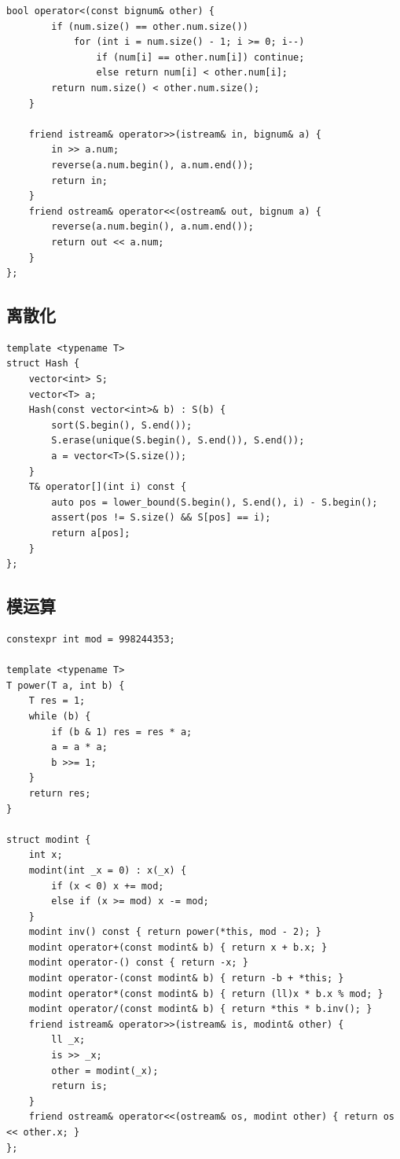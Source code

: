 \documentclass[UTF8, twoside]{ctexart}
\begin{document}
\begin{sloppypar}
\begin{lstlisting}[style=cpp]
    bool operator<(const bignum& other) {
        if (num.size() == other.num.size())
            for (int i = num.size() - 1; i >= 0; i--)
                if (num[i] == other.num[i]) continue;
                else return num[i] < other.num[i];
        return num.size() < other.num.size();
    }

    friend istream& operator>>(istream& in, bignum& a) {
        in >> a.num;
        reverse(a.num.begin(), a.num.end());
        return in;
    }
    friend ostream& operator<<(ostream& out, bignum a) {
        reverse(a.num.begin(), a.num.end());
        return out << a.num;
    }
};
\end{lstlisting}

\subsection{离散化}

\begin{lstlisting}[style=cpp]
template <typename T>
struct Hash {
    vector<int> S;
    vector<T> a;
    Hash(const vector<int>& b) : S(b) {
        sort(S.begin(), S.end());
        S.erase(unique(S.begin(), S.end()), S.end());
        a = vector<T>(S.size());
    }
    T& operator[](int i) const {
        auto pos = lower_bound(S.begin(), S.end(), i) - S.begin();
        assert(pos != S.size() && S[pos] == i);
        return a[pos];
    }
};
\end{lstlisting}

\subsection{模运算}

\begin{lstlisting}[style=cpp]
constexpr int mod = 998244353;

template <typename T>
T power(T a, int b) {
    T res = 1;
    while (b) {
        if (b & 1) res = res * a;
        a = a * a;
        b >>= 1;
    }
    return res;
}

struct modint {
    int x;
    modint(int _x = 0) : x(_x) {
        if (x < 0) x += mod;
        else if (x >= mod) x -= mod;
    }
    modint inv() const { return power(*this, mod - 2); }
    modint operator+(const modint& b) { return x + b.x; }
    modint operator-() const { return -x; }
    modint operator-(const modint& b) { return -b + *this; }
    modint operator*(const modint& b) { return (ll)x * b.x % mod; }
    modint operator/(const modint& b) { return *this * b.inv(); }
    friend istream& operator>>(istream& is, modint& other) {
        ll _x;
        is >> _x;
        other = modint(_x);
        return is;
    }
    friend ostream& operator<<(ostream& os, modint other) { return os << other.x; }
};
\end{lstlisting}


\end{sloppypar}
\end{document}
